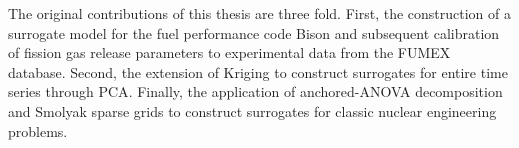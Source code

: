 The original contributions of this thesis are three fold. First, the construction of a surrogate model for the fuel performance code Bison and subsequent calibration of fission gas release parameters to experimental data from the FUMEX database. Second, the extension of Kriging to construct surrogates for entire time series through \ac{PCA}. Finally, the application of anchored-\ac{ANOVA} decomposition and Smolyak sparse grids to construct surrogates for classic nuclear engineering problems.


  